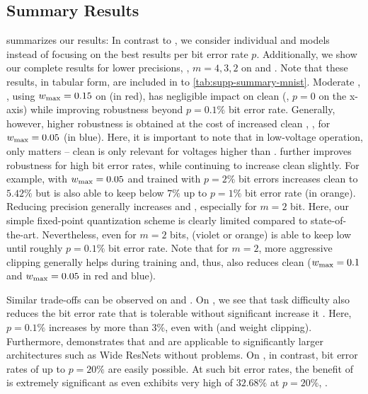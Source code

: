 \subsection{Summary Results}
\label{subsec:supp-experiments-summary}

 summarizes our results: In contrast to , we consider individual \Clipping and \Random models instead of focusing on the best results per bit error rate $p$. Additionally, we show our complete results for lower precisions, \ie, $m = 4,3,2$ on \CifarT and \MNIST. Note that these results, in tabular form, are included in  to \ref{tab:supp-summary-mnist}. Moderate \Clipping, \eg, using $\wmax = 0.15$ on \CifarT (in {\color{colorbrewer1}red}), has negligible impact on clean \TE (\ie, $p = 0$ on the x-axis) while improving robustness beyond $p = 0.1\%$ bit error rate. Generally, however, higher robustness is obtained at the cost of increased clean \TE, \eg, for $\wmax = 0.05$ (in {\color{colorbrewer2}blue}). Here, it is important to note that in low-voltage operation, only \RTE matters -- clean \TE is only relevant for voltages higher than \Vmin. \Random further improves robustness for high bit error rates, while continuing to increase clean \TE slightly. For example, \Random with $\wmax = 0.05$ and trained with $p = 2\%$ bit errors increases clean \TE to $5.42\%$ but is also able to keep \RTE below $7\%$ up to $p = 1\%$ bit error rate (in {\color{colorbrewer5}orange}). Reducing precision generally increases \TE and \RTE, especially for $m = 2$ bit. Here, our simple fixed-point quantization scheme is clearly limited compared to state-of-the-art. Nevertheless, even for $m = 2$ bits, \Random ({\color{colorbrewer4}violet} or {\color{colorbrewer5}orange}) is able to keep \RTE low until roughly $p = 0.1\%$ bit error rate. Note that for $m = 2$, more aggressive clipping generally helps during training and, thus, also reduces clean \TE (\cf $\wmax = 0.1$ and $\wmax = 0.05$ in {\color{colorbrewer1}red} and {\color{colorbrewer2}blue}).

Similar trade-offs can be observed on \CifarH and \MNIST. On \CifarH, we see that task difficulty also reduces the bit error rate that is tolerable without significant increase it \RTE. Here, $p = 0.1\%$ increases \RTE by more than $3\%$, even with \Random (and weight clipping). Furthermore, \CifarH demonstrates that \Clipping and \Random are applicable to significantly larger architectures such as Wide ResNets without problems. On \MNIST, in contrast, bit error rates of up to $p = 20\%$ are easily possible. At such bit error rates, the benefit of \Random is extremely significant as even \Clipping[$0.025$] exhibits very high \RTE of $32.68\%$ at $p = 20\%$, \cf {}.

